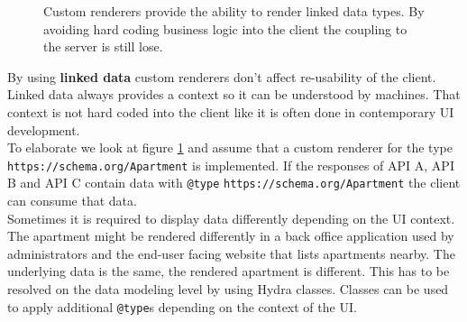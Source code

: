 \begin{figure}[!htb]
  \caption{Custom renderers provide the ability to render linked data types. By avoiding hard coding business logic into the client the coupling to the server is still lose.}
  \label{fig:linkeddata}
\end{figure}

By using \textbf{linked data} custom renderers don't affect re-usability of the client. Linked data always provides a context so it can be understood by machines. That context is not hard coded into the client like it is often done in contemporary UI development. \\
To elaborate we look at figure \ref{fig:linkeddata} and assume that a custom renderer for the type \lstinline{https://schema.org/Apartment} is implemented. If the responses of API A, API B and API C contain data with \lstinline{@type} \lstinline{https://schema.org/Apartment} the client can consume that data. \\
Sometimes it is required to display data differently depending on the UI context. The apartment might be rendered differently in a back office application used by administrators and the end-user facing website that lists apartments nearby. The underlying data is the same, the rendered apartment is different. This has to be resolved on the data modeling level by using Hydra classes. Classes can be used to apply additional \lstinline{@type}s depending on the context of the UI.
